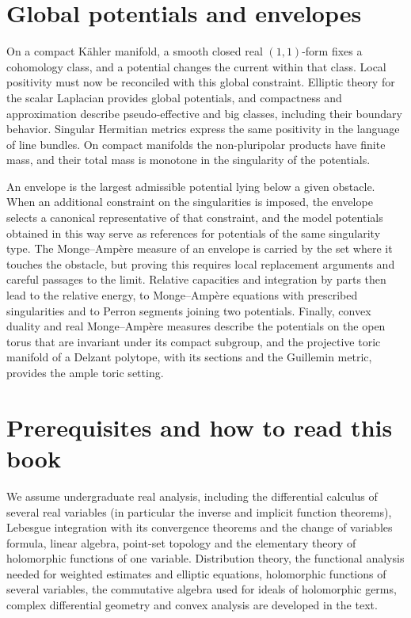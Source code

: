 \section*{Global potentials and envelopes}
On a compact K\"ahler manifold, a smooth closed real $(1,1)$-form fixes a cohomology class, and a potential changes the current within that class. Local positivity must now be reconciled with this global constraint. Elliptic theory for the scalar Laplacian provides global potentials, and compactness and approximation describe pseudo-effective and big classes, including their boundary behavior. Singular Hermitian metrics express the same positivity in the language of line bundles. On compact manifolds the non-pluripolar products have finite mass, and their total mass is monotone in the singularity of the potentials.

An envelope is the largest admissible potential lying below a given obstacle. When an additional constraint on the singularities is imposed, the envelope selects a canonical representative of that constraint, and the model potentials obtained in this way serve as references for potentials of the same singularity type. The Monge--Amp\`ere measure of an envelope is carried by the set where it touches the obstacle, but proving this requires local replacement arguments and careful passages to the limit. Relative capacities and integration by parts then lead to the relative energy, to Monge--Amp\`ere equations with prescribed singularities and to Perron segments joining two potentials. Finally, convex duality and real Monge--Amp\`ere measures describe the potentials on the open torus that are invariant under its compact subgroup, and the projective toric manifold of a Delzant polytope, with its sections and the Guillemin metric, provides the ample toric setting.

\section*{Prerequisites and how to read this book}
We assume undergraduate real analysis, including the differential calculus of several real variables (in particular the inverse and implicit function theorems), Lebesgue integration with its convergence theorems and the change of variables formula, linear algebra, point-set topology and the elementary theory of holomorphic functions of one variable. Distribution theory, the functional analysis needed for weighted estimates and elliptic equations, holomorphic functions of several variables, the commutative algebra used for ideals of holomorphic germs, complex differential geometry and convex analysis are developed in the text.

